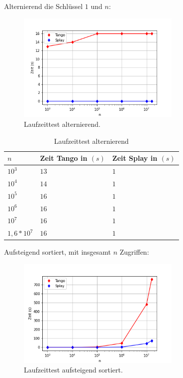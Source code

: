 \documentclass[a4paper,12pt]{article}
\begin{document}
\noindent Alternierend die Schlüssel $1$ und $n$:
 
\begin{figure}[H]
	\centering
	\includegraphics[width=0.7\textwidth]{"Medien/laufzeittest/diagramm/kleinGros"}
	\caption{Laufzeittest alternierend.}
\end{figure}
\begin{table}[H]
	\begin{center}
		\begin{tabular}[c]{|l|l|l|}
			\hline
			$n$ & Zeit Tango in $\left(s\right)$ &Zeit Splay in $\left(s\right)$ \\
			\hline
			$10^3$ & $13$ &$1$ \\
			\hline
			$10^4$  & $14$ &$1$  \\
			\hline
			$10^5$  & $16$ &$1$  \\
			\hline
			$10^6$  & $16$ &$1$  \\
			\hline
			$10^7$  & $16$ &$1$  \\
			\hline
			$1,6 *10^7$  & $16$ &$1$  \\
			\hline
		\end{tabular}
		\caption{Laufzeittest alternierend} 
	\end{center}
\end{table}
\noindent Aufsteigend sortiert, mit insgesamt $n$ Zugriffen:
\begin{figure}[H]
	\centering
	\includegraphics[width=0.7\textwidth]{"Medien/laufzeittest/diagramm/sorted1"}
	\caption{Laufzeittest aufsteigend sortiert.}
\end{figure}
\end{document}
